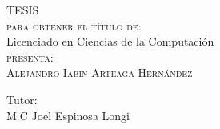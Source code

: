 \documentclass[12pt,oneside]{book}
\begin{document}
\begin{titlepage}
\begin{minipage}[c][0.81\textheight][t]{0.75\textwidth}
\begin{center}
                \vspace{2cm}            

                \textsc{\LARGE T\hspace{1.5cm}E\hspace{1.5cm}S\hspace{1.5cm}I\hspace{1.5cm}S}\\[2cm]
                \textsc{\large para obtener el t\'itulo de:}\\[1cm]
                {\large Licenciado en Ciencias de la Computación}\\[3cm]
                
                \textsc{\large presenta:}\\[0.5cm]
                \textsc{\large {Alejandro Iabin Arteaga Hernández}}\\[2cm]          

                \vspace{0.5cm}

                {\large Tutor:\\[0.3cm] {M.C Joel Espinosa Longi}}\\[.2in]

                \vspace{0.5cm}
            \end{center}
        \end{minipage}
    \end{titlepage}
\end{document}
